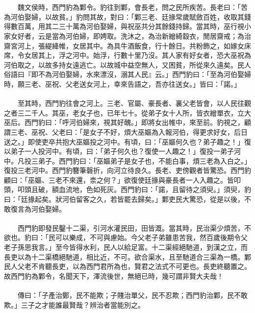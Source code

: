 \\\\
　　魏文侯時，西門豹為鄴令。豹往到鄴，會長老，問之民所疾苦。長老曰：「苦為河伯娶婦，以故貧。」豹問其故，對曰：「鄴三老、廷掾常歲賦斂百姓，收取其錢得數百萬，用其二三十萬為河伯娶婦，與祝巫共分其餘錢持歸。當其時，巫行視小家女好者，云是當為河伯婦，即娉取。洗沐之，為治新繒綺縠衣，閒居齋戒；為治齋宮河上，張緹絳帷，女居其中。為具牛酒飯食，行十餘日。共粉飾之，如嫁女床席，令女居其上，浮之河中。始浮，行數十里乃沒。其人家有好女者，恐大巫祝為河伯取之，以故多持女遠逃亡。以故城中益空無人，又困貧，所從來久遠矣。民人俗語曰『即不為河伯娶婦，水來漂沒，溺其人民』云。」西門豹曰：「至為河伯娶婦時，願三老、巫祝、父老送女河上，幸來告語之，吾亦往送女。」皆曰：「諾。」
\\\\
　　至其時，西門豹往會之河上。三老、官屬、豪長者、裏父老皆會，以人民往觀之者三二千人。其巫，老女子也，已年七十。從弟子女十人所，皆衣繒單衣，立大巫后。西門豹曰：「呼河伯婦來，視其好醜。」即將女出帷中，來至前。豹視之，顧謂三老、巫祝、父老曰：「是女子不好，煩大巫嫗為入報河伯，得更求好女，后日送之。」即使吏卒共抱大巫嫗投之河中。有頃，曰：「巫嫗何久也？弟子趣之！」復以弟子一人投河中。有頃，曰：「弟子何久也？復使一人趣之！」復投一弟子河中。凡投三弟子。西門豹曰：「巫嫗弟子是女子也，不能白事，煩三老為入白之。」復投三老河中。西門豹簪筆磬折，向河立待良久。長老、吏傍觀者皆驚恐。西門豹顧曰：「巫嫗、三老不來還，柰之何？」欲復使廷掾與豪長者一人入趣之。皆叩頭，叩頭且破，額血流地，色如死灰。西門豹曰：「諾，且留待之須臾。」須臾，豹曰：「廷掾起矣。狀河伯留客之久，若皆罷去歸矣。」鄴吏民大驚恐，從是以後，不敢復言為河伯娶婦。
\\\\
　　西門豹即發民鑿十二渠，引河水灌民田，田皆溉。當其時，民治渠少煩苦，不欲也。豹曰：「民可以樂成，不可與慮始。今父老子弟雖患苦我，然百歲後期令父老子孫思我言。」至今皆得水利，民人以給足富。十二渠經絕馳道，到漢之立，而長吏以為十二渠橋絕馳道，相比近，不可。欲合渠水，且至馳道合三渠為一橋。鄴民人父老不肯聽長吏，以為西門君所為也，賢君之法式不可更也。長吏終聽置之。故西門豹為鄴令，名聞天下，澤流後世，無絕已時，幾可謂非賢大夫哉！
\\\\
　　傳曰：「子產治鄭，民不能欺；子賤治單父，民不忍欺；西門豹治鄴，民不敢欺。」三子之才能誰最賢哉？辨治者當能別之。


